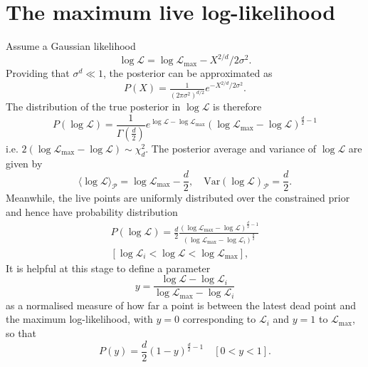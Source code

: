 \documentclass[usenatbib]{mnras}
\begin{document}
\section{The maximum live log-likelihood}\label{sec:logLmax}
Assume a Gaussian likelihood
\begin{equation}\label{eq:logL}
	\log\mathcal{L} = \log\mathcal{L}_\mathrm{max} - X^{2/d}/2\sigma^2.
\end{equation}
Providing that $\sigma^d \ll 1$, the posterior can be approximated as
\begin{equation}
    P(X) = \tfrac{1}{(2\pi\sigma^2)^{d/2}} e^{-X^{2/d}/2\sigma^2}.
    \label{eqn:PX}
\end{equation}
The distribution of the true posterior in $\log\mathcal{L}$ is therefore
\begin{equation}
    P(\log\mathcal{L}) = \frac{1}{\Gamma\left(\frac{d}{2}\right)}e^{\log\mathcal{L}-\log\mathcal{L}_\mathrm{max}} (\log\mathcal{L}_\mathrm{max}-\log\mathcal{L})^{\frac{d}{2}-1}
\end{equation}
i.e. $2(\log\mathcal{L}_\mathrm{max}-\log\mathcal{L}) \sim \chi^2_{d}$. The posterior average and variance of $\log \mathcal{L}$ are given by
\begin{equation}
    \langle\log\mathcal{L}\rangle_\mathcal{P} = \log\mathcal{L}_\mathrm{max} - \frac{d}{2},  \quad \mathrm{Var}(\log\mathcal{L})_\mathcal{P} = \frac{d}{2}.
\end{equation}
Meanwhile, the live points are uniformly distributed over the constrained prior and hence have probability distribution
\begin{multline}
	P(\log\mathcal{L}) = \frac{d}{2}\frac{(\log\mathcal{L}_\mathrm{max}-\log\mathcal{L})^{\frac{d}{2}-1}}{(\log\mathcal{L}_\mathrm{max}-\log\mathcal{L}_i)^{\frac{d}{2}}} \\
    [\log\mathcal{L}_i < \log\mathcal{L} <\log\mathcal{L}_\mathrm{max}],
    \label{eq:PL}
\end{multline}
It is helpful at this stage to define a parameter
\begin{equation}
    y = \frac{\log\mathcal{L}-\log\mathcal{L}_i}{\log\mathcal{L}_\mathrm{max}-\log\mathcal{L}_i}
    \label{eq:y}
\end{equation}
as a normalised measure of how far a point is between the latest dead point and the maximum log-likelihood, with $y=0$ corresponding to $\mathcal{L}_i$ and $y=1$ to $\mathcal{L}_\mathrm{max}$, so that
\begin{equation}
    P(y) = \frac{d}{2}(1-y)^{\frac{d}{2}-1} \quad [0<y<1].
    \label{eq:Py}
\end{equation}
\end{document}

